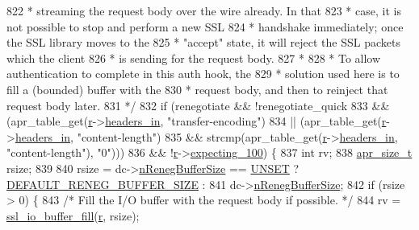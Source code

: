\begin{DoxyCode}
{{822 \textcolor{comment}{     * streaming the request body over the wire already.  In that}
823 \textcolor{comment}{     * case, it is not possible to stop and perform a new SSL}
824 \textcolor{comment}{     * handshake immediately; once the SSL library moves to the}
825 \textcolor{comment}{     * "accept" state, it will reject the SSL packets which the client}
826 \textcolor{comment}{     * is sending for the request body.}
827 \textcolor{comment}{     *}
828 \textcolor{comment}{     * To allow authentication to complete in this auth hook, the}
829 \textcolor{comment}{     * solution used here is to fill a (bounded) buffer with the}
830 \textcolor{comment}{     * request body, and then to reinject that request body later.}
831 \textcolor{comment}{     */}
832     \textcolor{keywordflow}{if} (renegotiate && !renegotiate\_quick
833         && (apr\_table\_get(\hyperlink{group__APACHE__CORE__CONFIG_ga091cdd45984e865a888a4f8bb8fe107a}{r}->\hyperlink{structrequest__rec_a5497da6c01af49acf70a4a9b975c1c83}{headers\_in}, \textcolor{stringliteral}{"transfer-encoding"})
834             || (apr\_table\_get(\hyperlink{group__APACHE__CORE__CONFIG_ga091cdd45984e865a888a4f8bb8fe107a}{r}->\hyperlink{structrequest__rec_a5497da6c01af49acf70a4a9b975c1c83}{headers\_in}, \textcolor{stringliteral}{"content-length"})
835                 && strcmp(apr\_table\_get(\hyperlink{group__APACHE__CORE__CONFIG_ga091cdd45984e865a888a4f8bb8fe107a}{r}->\hyperlink{structrequest__rec_a5497da6c01af49acf70a4a9b975c1c83}{headers\_in}, \textcolor{stringliteral}{"content-length"}), \textcolor{stringliteral}{"0"})))
836         && !\hyperlink{group__APACHE__CORE__CONFIG_ga091cdd45984e865a888a4f8bb8fe107a}{r}->\hyperlink{structrequest__rec_a58f8821d9463cfded49110353ced165d}{expecting\_100}) \{
837         \textcolor{keywordtype}{int} rv;
838         \hyperlink{group__apr__platform_gaaa72b2253f6f3032cefea5712a27540e}{apr\_size\_t} rsize;
839 
840         rsize = dc->\hyperlink{structSSLDirConfigRec_a980cac82c62111733035a55c90eacba4}{nRenegBufferSize} == \hyperlink{mod__authz__core_8c_ab0b265b69299aeccfade9365cf04db2a}{UNSET} ? 
      \hyperlink{group__MOD__SSL__PRIVATE_ga06c04b107f692e8af221db4e239eafbc}{DEFAULT\_RENEG\_BUFFER\_SIZE} :
841                                                 dc->\hyperlink{structSSLDirConfigRec_a980cac82c62111733035a55c90eacba4}{nRenegBufferSize};
842         \textcolor{keywordflow}{if} (rsize > 0) \{
843             \textcolor{comment}{/* Fill the I/O buffer with the request body if possible. */}
844             rv = \hyperlink{group__MOD__SSL__PRIVATE_gae9b480aadd01db006c92d9dbe84b8a07}{ssl\_io\_buffer\_fill}(\hyperlink{group__APACHE__CORE__CONFIG_ga091cdd45984e865a888a4f8bb8fe107a}{r}, rsize);
}}
\end{DoxyCode}
